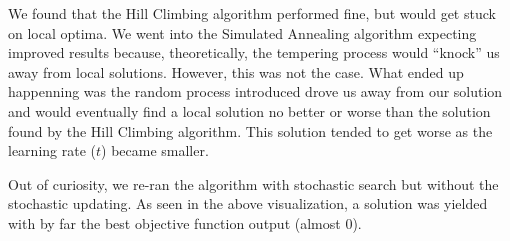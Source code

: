 \documentclass[11pt]{article}
\begin{document}
We found that the Hill Climbing algorithm performed fine, but would get
stuck on local optima. We went into the Simulated Annealing algorithm
expecting improved results because, theoretically, the tempering process
would ``knock'' us away from local solutions. However, this was not the
case. What ended up happenning was the random process introduced drove
us away from our solution and would eventually find a local solution no
better or worse than the solution found by the Hill Climbing algorithm.
This solution tended to get worse as the learning rate (\(t\)) became
smaller.

Out of curiosity, we re-ran the algorithm with stochastic search but
without the stochastic updating. As seen in the above visualization, a
solution was yielded with by far the best objective function output
(almost 0).


    
    
    
\end{document}
